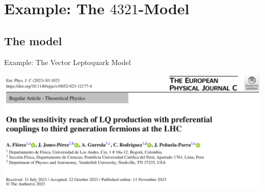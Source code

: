 \documentclass{../bredelebeamer}
\begin{document}
\section{Example: The $4321$-Model}
\subsection{The model}

\begin{frame}{Example: The Vector Leptoquark Model}
		\begin{center}
			\includegraphics[width=\linewidth]{on_vLQ.png}
		\end{center}	
\end{frame}

\end{document}
